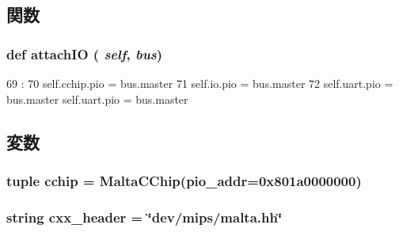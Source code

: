 \subsection{関数}
\hypertarget{classMalta_1_1Malta_ac750675f6d6de3ad52f8c5b03ee45a65}{
\subsubsection[{attachIO}]{\setlength{\rightskip}{0pt plus 5cm}def attachIO ( {\em self}, \/   {\em bus})}}
\label{classMalta_1_1Malta_ac750675f6d6de3ad52f8c5b03ee45a65}



\begin{DoxyCode}
69                            :
70         self.cchip.pio = bus.master
71         self.io.pio = bus.master
72         self.uart.pio = bus.master
        self.uart.pio = bus.master
\end{DoxyCode}


\subsection{変数}
\hypertarget{classMalta_1_1Malta_ac1636e20fc3bb3fadc00255ad114ce3f}{
\subsubsection[{cchip}]{\setlength{\rightskip}{0pt plus 5cm}tuple {\bf cchip} = {\bf MaltaCChip}(pio\_\-addr=0x801a0000000)}}
\label{classMalta_1_1Malta_ac1636e20fc3bb3fadc00255ad114ce3f}
\hypertarget{classMalta_1_1Malta_a17da7064bc5c518791f0c891eff05fda}{
\subsubsection[{cxx\_\-header}]{\setlength{\rightskip}{0pt plus 5cm}string {\bf cxx\_\-header} = \char`\"{}dev/mips/malta.hh\char`\"{}}}
\label{classMalta_1_1Malta_a17da7064bc5c518791f0c891eff05fda}



